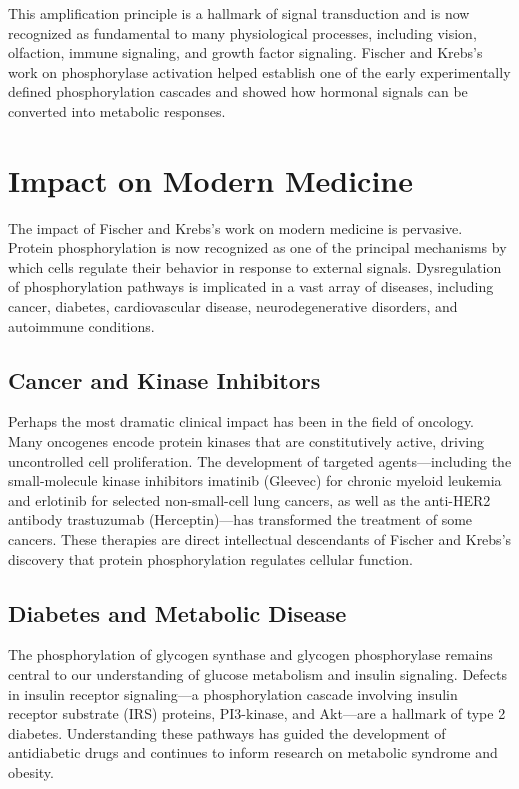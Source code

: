 This amplification principle is a hallmark of signal transduction and is now recognized as fundamental to many physiological processes, including vision, olfaction, immune signaling, and growth factor signaling. Fischer and Krebs's work on phosphorylase activation helped establish one of the early experimentally defined phosphorylation cascades and showed how hormonal signals can be converted into metabolic responses.

\section{Impact on Modern Medicine}

The impact of Fischer and Krebs's work on modern medicine is pervasive. Protein phosphorylation is now recognized as one of the principal mechanisms by which cells regulate their behavior in response to external signals. Dysregulation of phosphorylation pathways is implicated in a vast array of diseases, including cancer, diabetes, cardiovascular disease, neurodegenerative disorders, and autoimmune conditions.

\subsection{Cancer and Kinase Inhibitors}

Perhaps the most dramatic clinical impact has been in the field of oncology. Many oncogenes encode protein kinases that are constitutively active, driving uncontrolled cell proliferation. The development of targeted agents---including the small-molecule kinase inhibitors imatinib (Gleevec) for chronic myeloid leukemia and erlotinib for selected non-small-cell lung cancers, as well as the anti-HER2 antibody trastuzumab (Herceptin)---has transformed the treatment of some cancers. These therapies are direct intellectual descendants of Fischer and Krebs's discovery that protein phosphorylation regulates cellular function.

\subsection{Diabetes and Metabolic Disease}

The phosphorylation of glycogen synthase and glycogen phosphorylase remains central to our understanding of glucose metabolism and insulin signaling. Defects in insulin receptor signaling---a phosphorylation cascade involving insulin receptor substrate (IRS) proteins, PI3-kinase, and Akt---are a hallmark of type 2 diabetes. Understanding these pathways has guided the development of antidiabetic drugs and continues to inform research on metabolic syndrome and obesity.

